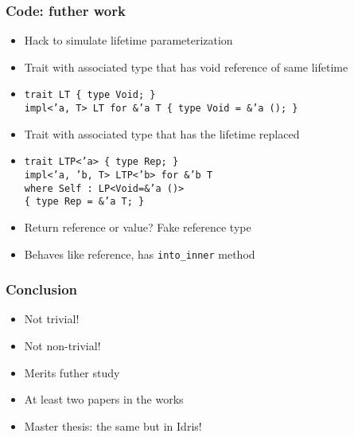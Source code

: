 \documentclass[xetex,mathserif,serif]{beamer}
\begin{document}
\begin{frame}
  \frametitle{Code: futher work}
  \pause
  \begin{itemize}[<+->]
    \item Hack to simulate lifetime parameterization
    \item Trait with associated type that has void reference of same lifetime
    \item \texttt{trait LT \{ type Void; \}\\
      impl<'a, T> LT for \&'a T \{ type Void = \&'a (); \}}
    \item Trait with associated type that has the lifetime replaced
    \item \texttt{trait LTP<'a> \{ type Rep; \}\\
      impl<'a, 'b, T> LTP<'b> for \&'b T \\
      where Self : LP<Void=\&'a ()>\\
      \{ type Rep = \&'a T; \}}
    \item Return reference or value? Fake reference type
    \item Behaves like reference, has \texttt{into\_inner} method
  \end{itemize}
\end{frame}

\begin{frame}
  \frametitle{Conclusion}
  \pause
  \begin{itemize}[<+->]
    \item Not trivial!
    \item Not non-trivial!
    \item Merits futher study
    \item At least two papers in the works
    \item Master thesis: the same but in Idris!
  \end{itemize}
\end{frame}
\end{document}
